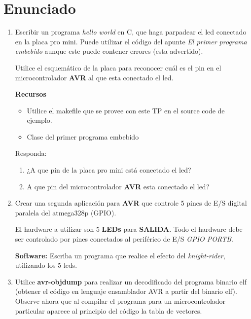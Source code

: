 \chapter*{Enunciado}

\begin{enumerate}
      \item
            Escribir un programa \textit{hello world} en C, que haga parpadear el led conectado en la placa pro mini. Puede utilizar el código del apunte \textit{El primer programa embebido} aunque este puede contener errores (esta advertido).

            Utilice el esquemático de la placa para reconocer cuál es el pin en el microcontrolador \textbf{AVR} al que esta conectado el led.

            \textbf{Recursos}
            \begin{itemize}
                  \item Utilice el makefile que se provee con este TP en el source code de ejemplo.
                  \item Clase del primer programa embebido
            \end{itemize}

            Responda:

            \begin{enumerate}[label=\arabic*]
                  \item ¿A que pin de la placa pro mini está conectado el led?
                  \item A que pin del microcontrolador \textbf{AVR} esta conectado el led?
            \end{enumerate}

      \item
            Crear una segunda aplicación para \textbf{AVR} que controle 5 pines de E/S digital paralela del atmega328p (GPIO).

            \vspace{0.3cm}

            El hardware a utilizar son 5 \textbf{LEDs} para \textbf{SALIDA}. Todo el hardware debe ser controlado por pines conectados al periférico de E/S \textit{GPIO PORTB}.

            \vspace{0.3cm}

            \textbf{Software: } Escriba un programa que realice el efecto del \textit{knight-rider}, utilizando los 5 leds.

      \item
            Utilice \textbf{avr-objdump} para realizar un decodificado del programa binario elf (obtener el código en lenguaje ensamblador AVR a partir del binario elf). Observe ahora que al compilar el programa para un microcontrolador particular aparece al principio del código la tabla de vectores.


\end{enumerate}
